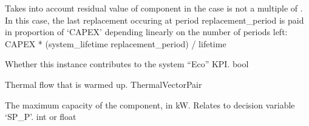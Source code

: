 \documentclass[letterpaper,10pt,english]{sphinxmanual}
\begin{document}
\begin{fulllineitems}
\begin{fulllineitems}
\sphinxAtStartPar
Takes into account residual value of component in the case  is not a multiple of .
In this case, the last replacement occuring at period replacement\_period is paid in proportion of ‘CAPEX’
depending linearly on the number of periods left:
CAPEX * (system\_lifetime \sphinxhyphen{} replacement\_period) / lifetime

\end{fulllineitems}


\begin{fulllineitems}
\label{\detokenize{generated/tamos.production.FPSolar:tamos.production.FPSolar.eco_count}}
\pysigstartsignatures
{}
\pysigstopsignatures
\sphinxAtStartPar
Whether this instance contributes to the system “Eco” KPI.
bool

\end{fulllineitems}


\begin{fulllineitems}
\label{\detokenize{generated/tamos.production.FPSolar:tamos.production.FPSolar.energy_sink}}
\pysigstartsignatures
{}
\pysigstopsignatures
\sphinxAtStartPar
Thermal flow that is warmed up.
ThermalVectorPair

\end{fulllineitems}


\begin{fulllineitems}
\label{\detokenize{generated/tamos.production.FPSolar:tamos.production.FPSolar.given_sizing}}
\pysigstartsignatures
{}
\pysigstopsignatures
\sphinxAtStartPar
The maximum capacity of the component, in kW.
Relates to decision variable ‘SP\_P’.
int or float

\end{fulllineitems}


\end{fulllineitems}
\end{document}
